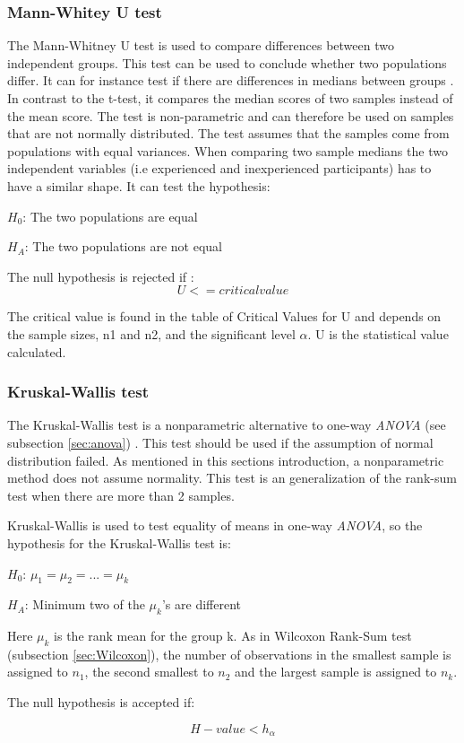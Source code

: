 \subsubsection{Mann-Whitey U test}\label{sec:mannwhiteyu}
The Mann-Whitney U test is used to compare differences between two independent groups. This test can be used to conclude whether two populations differ. It can for instance test if there are differences in medians between groups \citep{LundResearchLtd2013b}. In contrast to the t-test, it compares the median scores of two samples instead of the mean score. The test is non-parametric and can therefore be used on samples that are not normally distributed. The test assumes that the samples come from populations with equal variances. When comparing two sample medians the two independent variables (i.e experienced and inexperienced participants) has to have a similar shape. It can test the hypothesis: \\

\centerline{$H_{0}$: The two populations are equal} 
\centerline{$H_{A}$: The two populations are not equal}

The null hypothesis is rejected if \citep{LaMorte2017}: \\

\begin{equation}
\label{eq:mannwhitey-ciritcalvalue}
U <= critical value
\end{equation}

The critical value is found in the table of Critical Values for U and depends on the sample sizes, n1 and n2, and the significant level $\alpha$. U is the statistical value calculated. 

\subsubsection[Kruskal]{Kruskal-Wallis test}\label{sec:kruskal-w-test}
The Kruskal-Wallis test is a nonparametric alternative to one-way \textit{ANOVA} (see subsection \ref{sec:anova})  \citep{Walpole2012}. This test should be used if the assumption of normal distribution failed. As mentioned in this sections introduction, a nonparametric method does not assume normality. This test is an generalization of the rank-sum test when there are more than 2 samples.

Kruskal-Wallis is used to test equality of means in one-way \textit{ANOVA}, so the hypothesis for the Kruskal-Wallis test is:\newline

\centerline{$H_{0}$:  $\mu_{1} =  \mu_{2} = ... = \mu_{k} $} 
\centerline{$H_{A}$: Minimum two of the $\mu_{k}$'s are different}

Here $\mu_{k}$ is the rank mean for the group k. As in Wilcoxon Rank-Sum test (subsection \ref{sec:Wilcoxon}), the number of observations in the smallest sample is assigned to $n_1$, the second smallest to $n_2$ and the largest sample is assigned to $n_k$. 

The null hypothesis is accepted if: 

\begin{equation}
\label{eq:kruskapw-accept}
H-value < h_{\alpha}
\end{equation}